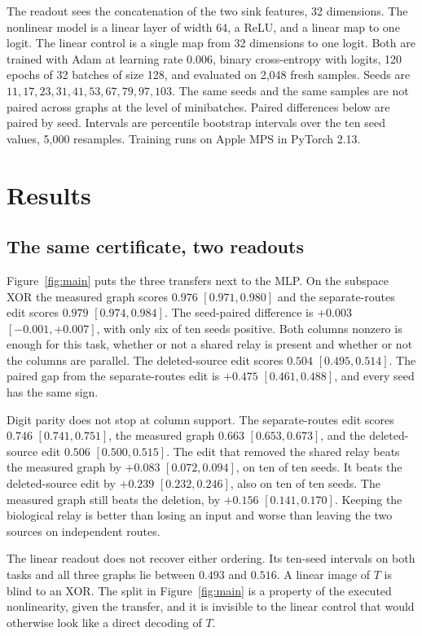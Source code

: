 \documentclass[10pt,twocolumn,letterpaper]{article}
\begin{document}
The readout sees the concatenation of the two sink features, 32 dimensions.
The nonlinear model is a linear layer of width 64, a ReLU, and a linear map to one logit.
The linear control is a single map from 32 dimensions to one logit.
Both are trained with Adam at learning rate $0.006$, binary cross-entropy with logits, 120 epochs of 32 batches of size 128, and evaluated on 2,048 fresh samples.
Seeds are $11, 17, 23, 31, 41, 53, 67, 79, 97, 103$.
The same seeds and the same samples are not paired across graphs at the level of minibatches.
Paired differences below are paired by seed.
Intervals are percentile bootstrap intervals over the ten seed values, 5,000 resamples.
Training runs on Apple MPS in PyTorch 2.13.

\section{Results}
\label{sec:results}

\subsection{The same certificate, two readouts}
\label{sec:split}

Figure~\ref{fig:main} puts the three transfers next to the MLP.
On the subspace XOR the measured graph scores $0.976$ $[0.971, 0.980]$ and the separate-routes edit scores $0.979$ $[0.974, 0.984]$.
The seed-paired difference is $+0.003$ $[-0.001, +0.007]$, with only six of ten seeds positive.
Both columns nonzero is enough for this task, whether or not a shared relay is present and whether or not the columns are parallel.
The deleted-source edit scores $0.504$ $[0.495, 0.514]$.
The paired gap from the separate-routes edit is $+0.475$ $[0.461, 0.488]$, and every seed has the same sign.

Digit parity does not stop at column support.
The separate-routes edit scores $0.746$ $[0.741, 0.751]$, the measured graph $0.663$ $[0.653, 0.673]$, and the deleted-source edit $0.506$ $[0.500, 0.515]$.
The edit that removed the shared relay beats the measured graph by $+0.083$ $[0.072, 0.094]$, on ten of ten seeds.
It beats the deleted-source edit by $+0.239$ $[0.232, 0.246]$, also on ten of ten seeds.
The measured graph still beats the deletion, by $+0.156$ $[0.141, 0.170]$.
Keeping the biological relay is better than losing an input and worse than leaving the two sources on independent routes.

The linear readout does not recover either ordering.
Its ten-seed intervals on both tasks and all three graphs lie between $0.493$ and $0.516$.
A linear image of $T$ is blind to an XOR.
The split in Figure~\ref{fig:main} is a property of the executed nonlinearity, given the transfer, and it is invisible to the linear control that would otherwise look like a direct decoding of $T$.
\end{document}
